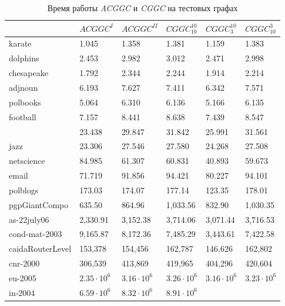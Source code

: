 \begin{table}[H]
	\caption{Время работы \emph{ACGGC} и \emph{CGGC} на тестовых графах}
	\label{tab:es-res-q}
	\begin{tabularx}{\textwidth}{XR{1.7cm}R{1.7cm}R{1.7cm}R{1.7cm}R{1.7cm}}
				& $ACGGC^{I}$ & $ACGGC^{II}$ & $CGGC_{10}^{10}$	& $CGGC_{3}^{10}$ & $CGGC_{10}^{3}$ \\ \hline
	karate 			& 1.045 	& 1.358	 	& 1.381 	& 1.159		& 1.383		\\
	dolphins		& 2.453		& 2.982		& 3.012		& 2.471		& 2.998		\\
	chesapeake		& 1.792		& 2.344		& 2.244		& 1.914		& 2.214		\\
	adjnoun			& 6.193		& 7.627		& 7.411		& 6.342		& 7.571		\\
	polbooks		& 5.064		& 6.310		& 6.136		& 5.166		& 6.135		\\
	football		& 7.157		& 8.441		& 8.638		& 7.439		& 8.547		\\
	\celegans 		& 23.438	& 29.847	& 31.842	& 25.991	& 31.561	\\
	jazz			& 23.306	& 27.546	& 27.580	& 24.268	& 27.508	\\
	netscience		& 84.985	& 61.307	& 60.831	& 40.893	& 59.673	\\
	email			& 71.719	& 91.856	& 94.421	& 80.227	& 94.101	\\
	polblogs		& 173.03	& 174.07	& 177.14	& 123.35	& 178.01	\\
	pgpGiantCompo	& 635.50	& 864.96	& 1,033.56	& 832.90	& 1,030.35	\\
	as-22july06		& 2,330.91	& 3,152.38	& 3,714.06	& 3,071.44	& 3,716.53	\\
	cond-mat-2003	& 9,165.87	& 8,172.36	& 7,485.29	& 3,443.61	& 7,422.58	\\
	caidaRouterLevel& 153,378	& 154,456	& 162,787	& 146,626	& 162,802	\\
	cnr-2000		& 306,539	& 413,869	& 419,965	& 404,296	& 420,604	\\	
	eu-2005			& $2.35\cdot 10^6$	& $3.16\cdot 10^6$	& $3.26\cdot 10^6$	& $3.16\cdot 10^6$ & $3.23\cdot 10^6$ \\
	in-2004			& $6.59\cdot 10^6$	& $8.32\cdot 10^6$	& $8.91\cdot 10^6$	& 			& 			\\
	\hline
	\end{tabularx}
\end{table}